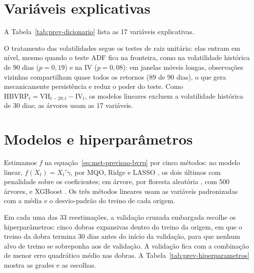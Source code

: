 \section{Variáveis explicativas}
\label{sec:prev-variaveis}

A Tabela~\ref{tab:prev-dicionario} lista as 17 variáveis explicativas.

O tratamento das volatilidades segue os testes de raiz unitária: elas
entram em nível, mesmo quando o teste ADF fica na fronteira, como na
volatilidade histórica de 90 dias ($p = 0{,}19$) e na IV ($p = 0{,}08$): em
janelas móveis longas, observações vizinhas compartilham quase todos os
retornos (89 de 90 dias), o que gera mecanicamente persistência e reduz o poder do
teste. Como $\text{HBVRP}_t = \text{VH}_{t-29:t} - \text{IV}_t$,
os modelos lineares excluem a volatilidade histórica de 30 dias; as árvores
usam as 17 variáveis.



\section{Modelos e hiperparâmetros}
\label{sec:prev-modelos}

Estimamos $f$ na equação~\eqref{eq:met-previsao-bvrp} por cinco
métodos: no modelo linear, $f(X_t) = X_t'\gamma$, por MQO, Ridge
\citep{hoerl1970ridge} e LASSO \citep{tibshirani1996lasso}, os dois últimos com
penalidade sobre os coeficientes; em árvore, por floresta aleatória
\citep{breiman2001randomforest}, com 500 árvores, e XGBoost
\citep{chen2016xgboost}. Os três métodos lineares usam as variáveis
padronizadas com a média e o desvio-padrão do treino de cada origem.

Em cada uma das 33 reestimações, a validação cruzada embargada
\citep{lopezdeprado2018advances} escolhe os hiperparâmetros: cinco dobras
expansivas dentro do treino da origem, em que o treino da dobra termina 30 dias
antes do início da validação, para que nenhum alvo de treino se sobreponha aos
de validação. A validação fica com a combinação de menor erro quadrático médio
nas dobras. A Tabela~\ref{tab:prev-hiperparametros} mostra as grades e as escolhas.


